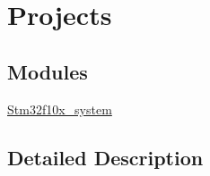 \hypertarget{group___projects}{}\section{Projects}
\label{group___projects}
\subsection*{Modules}
\begin{DoxyCompactItemize}
\item 
\mbox{\hyperlink{group__stm32f10x__system}{Stm32f10x\+\_\+system}}
\end{DoxyCompactItemize}


\subsection{Detailed Description}
